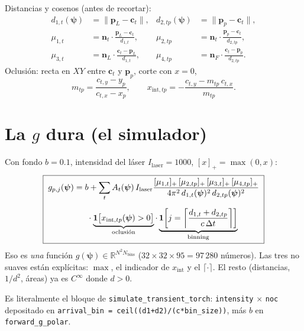 \documentclass[11pt,a4paper]{article}
\newcommand{\vect}[1]{\boldsymbol{#1}}
\newcommand{\code}[1]{\texttt{#1}}
\theoremstyle{definition}
\begin{document}
Distancias y cosenos (antes de recortar):
%
\begin{align}
d_{1,t}(\vect\psi)
&=\lVert\vect p_L-\vect c_t\rVert,
&
d_{2,tp}(\vect\psi)
&=\lVert\vect p_p-\vect c_t\rVert,
\label{eq:d}\\[4pt]
\mu_{1,t}
&=\vect n_t\cdot\frac{\vect p_L-\vect c_t}{d_{1,t}},
&
\mu_{2,tp}
&=\vect n_t\cdot\frac{\vect p_p-\vect c_t}{d_{2,tp}},
\label{eq:mu12}\\[4pt]
\mu_{3,t}
&=\vect n_L\cdot\frac{\vect c_t-\vect p_L}{d_{1,t}},
&
\mu_{4,tp}
&=\vect n_F\cdot\frac{\vect c_t-\vect p_p}{d_{2,tp}}.
\label{eq:mu34}
\end{align}
%
Oclusi\'on: recta en $XY$ entre $\vect c_t$ y $\vect p_p$, corte con $x=0$,
%
\begin{equation}
\label{eq:xint}
m_{tp}=\frac{c_{t,y}-y_p}{c_{t,x}-x_p},
\qquad
x_{\mathrm{int},tp}
=
-\frac{c_{t,y}-m_{tp}\,c_{t,x}}{m_{tp}}.
\end{equation}

\section{La $g$ dura (el simulador)}
\label{sec:dura}

Con fondo $b=0.1$, intensidad del l\'aser $I_{\mathrm{laser}}=1000$, $[x]_+=\max(0,x)$:
%
\begin{equation}
\label{eq:g-dura}
\boxed{\;
\begin{aligned}
g_{p,j}(\vect\psi)
&=
b
+
\sum_t
A_t(\vect\psi)\,
I_{\mathrm{laser}}
\frac
{[\mu_{1,t}]_+\,[\mu_{2,tp}]_+\,[\mu_{3,t}]_+\,[\mu_{4,tp}]_+}
{4\pi^2\,d_{1,t}(\vect\psi)^2\,d_{2,tp}(\vect\psi)^2}
\\[6pt]
&\hspace{1.6em}
\cdot
\underbrace{\mathbf{1}\bigl[x_{\mathrm{int},tp}(\vect\psi)>0\bigr]}_{\text{oclusi\'on}}
\cdot
\underbrace{\mathbf{1}\!\left[j=\left\lceil\frac{d_{1,t}+d_{2,tp}}{c\,\Delta t}\right\rceil\right]}_{\text{binning}}
\end{aligned}
\;}
\end{equation}
%
Eso es \emph{una} funci\'on $g(\vect\psi)\in\mathbb R^{N^2 N_{\mathrm{bins}}}$
($32\times32\times95=97\,280$ n\'umeros). Las tres no suaves est\'an
expl\'icitas: $\max$, el indicador de $x_{\mathrm{int}}$ y el $\lceil\cdot\rceil$.
El resto (distancias, $1/d^2$, \'areas) ya es $C^\infty$ donde $d>0$.

Es literalmente el bloque de \code{simulate\_transient\_torch}:
\code{intensity} $\times$ \code{noc} depositado en
\code{arrival\_bin = ceil((d1+d2)/(c*bin\_size))}, m\'as $b$ en
\code{forward\_g\_polar}.
\end{document}
